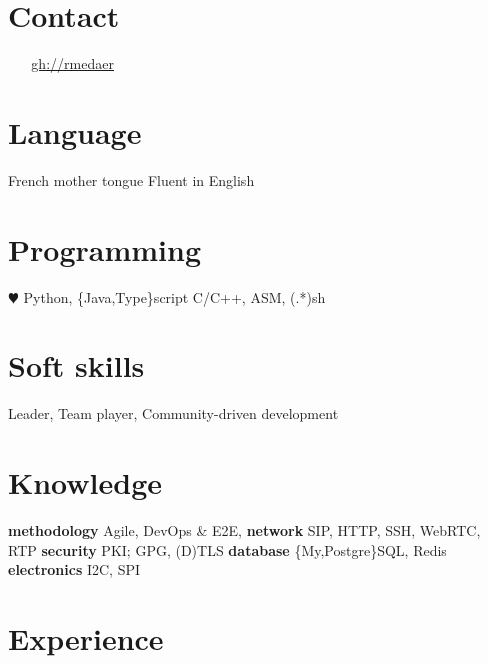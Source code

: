 \documentclass[]{friggeri-cv} %
\begin{document}


\begin{aside} %
\section{Contact}
\myAddress
~
\href{\myUriPhoneNumber}{\myPhoneNumber}
~
\href{mailto:\myPrivateMail}{\ul{\myPrivateMail}}
\href{http://github.com/rmedaer}{\ul{gh://rmedaer}}
\section{Language}
French mother tongue
Fluent in English
\section{Programming}
{\color{red} $\varheartsuit$} Python, \{Java,Type\}script
C/C++, ASM, (.*)sh
\section{Soft skills}
Leader,
Team player,
Community-driven development
\section{Knowledge}
\textbf{methodology}
Agile, DevOps \& E2E,
\textbf{network}
SIP, HTTP, SSH, WebRTC, RTP
\textbf{security}
PKI; GPG, (D)TLS
\textbf{database}
\{My,Postgre\}SQL, Redis
\textbf{electronics}
I2C, SPI
\end{aside}


\section{Experience}
\end{document}
